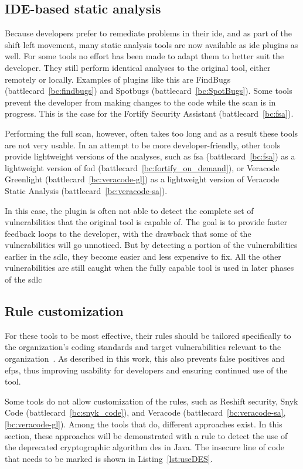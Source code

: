 \subsection{IDE-based static analysis}
Because developers prefer to remediate problems in their \gls{ide}, and as part of the shift left movement, many static analysis tools are now available as \gls{ide} plugins as well.
For some tools no effort has been made to adapt them to better suit the developer.
They still perform identical analyses to the original tool, either remotely or locally.
Examples of plugins like this are FindBugs (battlecard~\ref{bc:findbugs}) and Spotbugs (battlecard~\ref{bc:SpotBugs}).
Some tools prevent the developer from making changes to the code while the scan is in progress.
This is the case for the Fortify Security Assistant (battlecard~\ref{bc:fsa}).

Performing the full scan, however, often takes too long and as a result these tools are not very usable.
In an attempt to be more developer-friendly, other tools provide lightweight versions of the analyses, such as \gls{fsa} (battlecard~\ref{bc:fsa}) as a lightweight version of \gls{fod} (battlecard~\ref{bc:fortify_on_demand}), or Veracode Greenlight (battlecard~\ref{bc:veracode-gl}) as a lightweight version of Veracode Static Analysis (battlecard~\ref{bc:veracode-sa}).

In this case, the plugin is often not able to detect the complete set of vulnerabilities that the original tool is capable of.
The goal is to provide faster feedback loops to the developer, with the drawback that some of the vulnerabilities will go unnoticed.
But by detecting a portion of the vulnerabilities earlier in the \gls{sdlc}, they become easier and less expensive to fix.
All the other vulnerabilities are still caught when the fully capable tool is used in later phases of the \gls{sdlc}

\subsection{Rule customization}
\label{sec:customization}
For these tools to be most effective, their rules should be tailored specifically to the organization's coding standards and target vulnerabilities relevant to the organization~\cite{bsimm9,bsimm11}.
As described in this work, this also prevents false positives and \glspl{efp}, thus improving usability for developers and ensuring continued use of the tool.

Some tools do not allow customization of the rules, such as Reshift security, Snyk Code (battlecard~\ref{bc:snyk_code}), and Veracode (battlecard~\ref{bc:veracode-sa},\ref{bc:veracode-gl}).
Among the tools that do, different approaches exist.
In this section, these approaches will be demonstrated with a rule to detect the use of the deprecated cryptographic algorithm \gls{des} in Java.
The insecure line of code that needs to be marked is shown in Listing~\ref{lst:useDES}.

